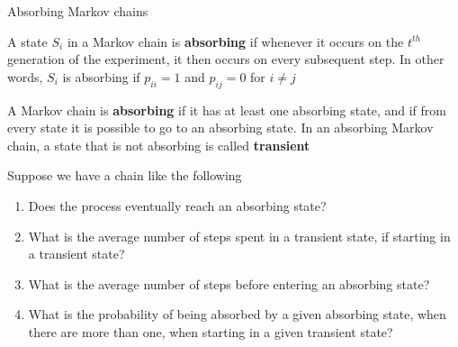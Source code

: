 \documentclass[aspectratio=169]{beamer}\usepackage[]{graphicx}\usepackage[]{xcolor}
\begin{document}
\begin{frame}{Absorbing Markov chains}
\begin{definition}
A state $S_i$ in a Markov chain is \textbf{absorbing} if whenever it occurs on the $t^{th}$ generation of the experiment, it then occurs on every subsequent step. In other words, $S_i$ is absorbing if $p_{ii}=1$ and $p_{ij}=0$ for $i\neq j$
\end{definition}
\vfill
\begin{definition}
A Markov chain is \textbf{absorbing} if it has at least one absorbing state, and if from every state it is possible to go to an absorbing state.
In an absorbing Markov chain, a state that is not absorbing is called \textbf{transient}
\end{definition}
\end{frame}


\begin{frame}
Suppose we have a chain like the following
\begin{center}
\end{center}
\vfill
\begin{enumerate}
\item Does the process eventually reach an absorbing state?
\item What is the average number of steps spent in a transient state, if starting in a transient state?
\item What is the average number of steps before entering an absorbing state?
\item What is the probability of being absorbed by a given absorbing state, when there are more than one, when starting in a given transient state?
\end{enumerate}
\end{frame}
\end{document}
